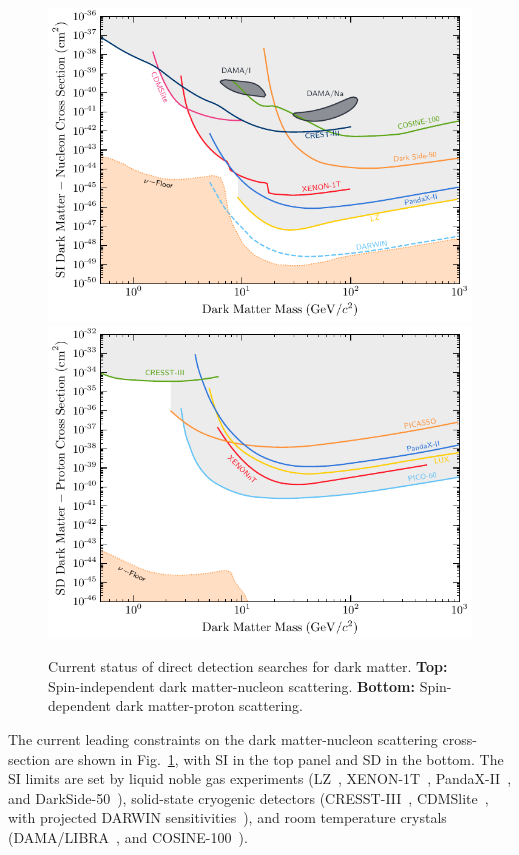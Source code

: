 \begin{figure}
    \centering
    \includegraphics{img/chapter_1/DM_limits_SI.pdf}
    \includegraphics{img/chapter_1/DM_limits_SD_p.pdf}
    \caption{Current status of direct detection searches for dark matter. \textbf{Top:} Spin-independent dark matter-nucleon scattering. \textbf{Bottom:} Spin-dependent dark matter-proton scattering.}
    \label{fig:direct_detection_lims}
\end{figure}

The current leading constraints on the dark matter-nucleon scattering cross-section
are shown in Fig.~\ref{fig:direct_detection_lims}, with SI in the top panel and SD in the bottom.
The SI limits are set by liquid noble gas experiments (LZ~\cite{LZ:2022lsv_jul_FirstDarkMatter}, 
XENON-1T~\cite{XENON:2020gfr_mar_SearchCoherentElastic}, PandaX-II~\cite{PandaX-4T:2021bab_dec_DarkMatterSearch},
and DarkSide-50~\cite{DarkSide:2022dhx_mar_SearchDarkMatterNucleon}), solid-state cryogenic detectors (CRESST-III~\cite{CRESST:2019jnq_nov_FirstresultsCRESSTIII}, CDMSlite~\cite{SuperCDMS:2023sql_jun_SearchLowmassDark}, with projected DARWIN sensitivities~\cite{Aalbers:2022dzr_dec_Nextgenerationliquidxenon}), 
and room temperature crystals (DAMA/LIBRA~\cite{Savage:2008er_CompatibilityDAMALIBRA}, and COSINE-100~\cite{COSINE-100:2021xqn_nov_StrongconstraintsCOSINE100}). 

